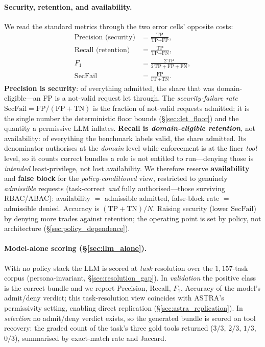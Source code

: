 \documentclass[sigconf,review,anonymous]{acmart}
\begin{document}
\paragraph{Security, retention, and availability.} We read the standard metrics through the two error cells' opposite costs:
\begin{align}
\text{Precision (security)} &= \frac{\text{TP}}{\text{TP}+\text{FP}}, \label{eq:pr}\\
\text{Recall (retention)} &= \frac{\text{TP}}{\text{TP}+\text{FN}}, \\
F_1 &= \frac{2\,\text{TP}}{2\,\text{TP}+\text{FP}+\text{FN}}, \\
\mathrm{SecFail} &= \frac{\text{FP}}{\text{FP}+\text{TN}}. \label{eq:secfail}
\end{align}
\textbf{Precision is security}: of everything admitted, the share that was domain-eligible---an FP is a not-valid request let through. The \emph{security-failure rate} $\mathrm{SecFail}=\text{FP}/(\text{FP}+\text{TN})$ is the fraction of not-valid requests admitted; it is the single number the deterministic floor bounds (\S\ref{sec:det_floor}) and the quantity a permissive LLM inflates. \textbf{Recall is \emph{domain-eligible retention}}, not availability: of everything the benchmark labels valid, the share admitted. Its denominator authorises at the \emph{domain} level while enforcement is at the finer \emph{tool} level, so it counts correct bundles a role is not entitled to run---denying those is \emph{intended} least-privilege, not lost availability. We therefore reserve \textbf{availability} and \textbf{false block} for the \emph{policy-conditioned} view, restricted to genuinely \emph{admissible} requests (task-correct \emph{and} fully authorised---those surviving RBAC/ABAC): availability $=$ admissible admitted, false-block rate $=$ admissible denied. Accuracy is $(\text{TP}+\text{TN})/N$. Raising security (lower $\mathrm{SecFail}$) by denying more trades against retention; the operating point is set by policy, not architecture (\S\ref{sec:policy_dependence}).

\paragraph{Model-alone scoring (\S\ref{sec:llm_alone}).} With no policy stack the LLM is scored at \emph{task} resolution over the $1{,}157$-task corpus (persona-invariant, \S\ref{sec:resolution_gap}). In \emph{validation} the positive class is the correct bundle and we report Precision, Recall, $F_1$, Accuracy of the model's admit/deny verdict; this task-resolution view coincides with ASTRA's permissivity setting, enabling direct replication (\S\ref{sec:astra_replication}). In \emph{selection} no admit/deny verdict exists, so the generated bundle is scored on tool recovery: the graded count of the task's three gold tools returned ($3/3$, $2/3$, $1/3$, $0/3$), summarised by exact-match rate and Jaccard.
\end{document}
